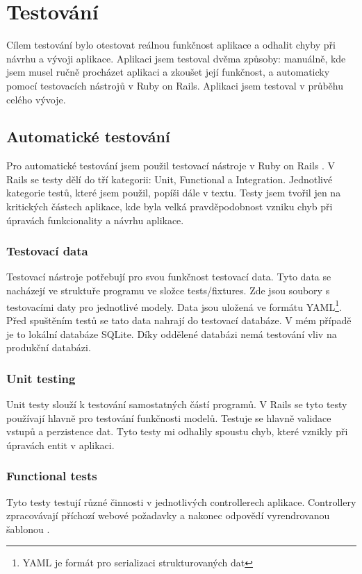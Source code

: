 \chapter{Testování}

Cílem testování bylo otestovat reálnou funkčnost aplikace a odhalit chyby při návrhu a vývoji aplikace. Aplikaci jsem testoval dvěma způsoby: manuálně, kde jsem musel ručně procházet aplikaci a zkoušet její funkčnost, a automaticky pomocí testovacích nástrojů v Ruby on Rails. Aplikaci jsem testoval v průběhu celého vývoje. 

\section{Automatické testování}
Pro automatické testování jsem použil testovací nástroje v Ruby on Rails \cite{RoR_testing}. V Rails se testy dělí do tří kategorii: Unit, Functional a Integration. Jednotlivé kategorie testů, které jsem použil, popíši dále v textu. Testy jsem tvořil jen na kritických částech aplikace, kde byla velká pravděpodobnost vzniku chyb při úpravách funkcionality a návrhu aplikace.

\subsection{Testovací data}
Testovací nástroje potřebují pro svou funkčnost testovací data. Tyto data se nacházejí ve struktuře programu ve složce tests/fixtures. Zde jsou soubory s testovacími daty pro jednotlivé modely. Data jsou uložená ve formátu YAML\footnote{YAML je formát pro serializaci strukturovaných dat}. Před spuštěním testů se tato data
nahrají do testovací databáze. V mém případě je to lokální databáze SQLite. Díky oddělené databázi nemá testování vliv na produkční databázi.

\subsection{Unit testing}
Unit testy slouží k testování samostatných částí programů. V Rails se tyto testy používají hlavně pro testování funkčnosti modelů. Testuje se hlavně validace vstupů a perzistence dat. Tyto testy mi odhalily spoustu chyb, které vznikly při úpravách entit v aplikaci.

\subsection{Functional tests}
Tyto testy testují různé činnosti v jednotlivých controllerech aplikace. Controllery zpracovávají příchozí webové požadavky a nakonec odpovědí vyrendrovanou šablonou \cite{RoR_testing}.

